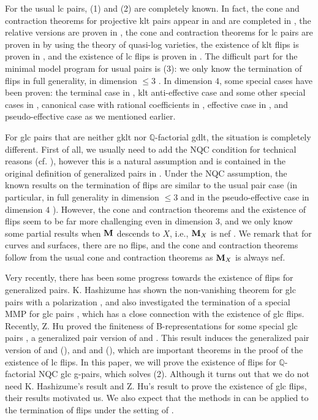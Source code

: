 \documentclass[11pt]{amsart}
\numberwithin{equation}{section}
\newcommand{\Mm}{{\bf{M}}}
\newcommand{\Qq}{\mathbb{Q}}
\theoremstyle{definition}
\theoremstyle{definition}
\theoremstyle{definition}
\begin{document}
For the usual lc pairs, (1) and (2) are completely known. In fact, the cone and contraction theorems for projective klt pairs appear in \cite{Kaw84} and are completed in \cite{Kol84}, the relative versions are proven in \cite{KMM87}, the cone and contraction theorems for lc pairs are proven in \cite{Amb03,Fuj11} by using the theory of quasi-log varieties, the existence of klt flips is proven in \cite{BCHM10}, and the existence of lc flips is proven in \cite{Bir12a,HX13}. The difficult part for the minimal model program for usual pairs is (3): we only know the termination of flips in full generality, in dimension $\leq 3$ \cite{Kaw92,Sho96}. In dimension $4$, some special cases have been proven: the terminal case in \cite{KMM87}, klt anti-effective case and some other special cases in \cite{AHK07}, canonical case with rational coefficients in \cite{Fuj04,Fuj05}, effective case in \cite{Bir07,HMX14}, and pseudo-effective case  \cite{Mor18,HL18,HM20,CT20} as we mentioned earlier.

For glc pairs that are neither gklt nor $\Qq$-factorial gdlt, the situation is completely different. First of all, we usually need to add the NQC condition for technical reasons (cf. \cite[Example 3.15]{HL18}), however this is a natural assumption and is contained in the original definition of generalized pairs in \cite{BZ16}. Under the NQC assumption, the known results on the termination of flips are similar to the usual pair case (in particular, in full generality in dimension $\leq 3$ \cite{CT20} and in the pseudo-effective case in dimension $4$ \cite{HM20,CT20}). However, the cone and contraction theorems and the existence of flips seem to be far more challenging even in dimension $3$, and we only know some partial results when $\Mm$ descends to $X$, i.e., $\Mm_X$ is nef \cite{LP20a,LP20b}. We remark that for curves and surfaces, there are no flips, and the cone and contraction theorems follow from the usual cone and contraction theorems as $\Mm_X$ is always nef. 

Very recently, there has been some progress towards the existence of flips for generalized pairs. K. Hashizume has shown the non-vanishing theorem for glc pairs with a polarization  \cite[Theorem 1.1]{Has20}, and also investigated the termination of a special MMP for glc pairs \cite[Theorem 1.3]{Has20}, which has a close connection with the existence of glc flips. Recently, Z. Hu proved the finiteness of B-representations for some special glc pairs \cite[Theorem 1.5]{Hu21}, a generalized pair version of \cite[Theorem 1.1]{FG14} and \cite[Theorem 1.2]{HX16}. This result induces the generalized pair version of \cite[Theorem 1.4]{FG14} and \cite[Theorem 1.4]{HX16}  (\cite[Thereom 1.9]{Hu21}), and \cite[Theorem 1.7]{Bir12a} and \cite[Corollary 1.5]{HX16}  (\cite[Thereom 1.10]{Hu21}), which are important theorems in the proof of the existence of lc flips. In this paper, we will prove the existence of flips for $\Qq$-factorial NQC glc g-pairs, which solves (2). Although it turns out that we do not need  K. Hashizume's result and Z. Hu's result to prove the existence of glc flips, their results motivated us. We also expect that the methods in \cite{Hu21} can be applied to the termination of flips under the setting of \cite[Theorem 1.3]{Has20}. 
\end{document}
